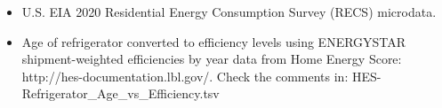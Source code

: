 \begin{itemize}
\item U.S. EIA 2020 Residential Energy Consumption Survey (RECS) microdata.
\item Age of refrigerator converted to efficiency levels using ENERGYSTAR shipment-weighted efficiencies by year data from Home Energy Score: http://hes-documentation.lbl.gov/. Check the comments in: HES-Refrigerator_Age_vs_Efficiency.tsv
\end{itemize}
